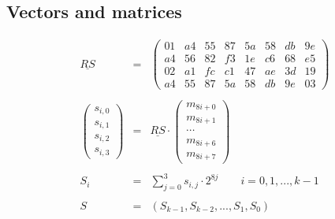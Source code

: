 \begin{table}[htb]
\subsection{Vectors and matrices}
\begin{equation}
\begin{array}{rcl}
\underline{RS} & = & \left(\begin{array}{cccccccc}
01 & a4 & 55 & 87 & 5a & 58 & db & 9e\\
a4 & 56 & 82 & f3 & 1e & c6 & 68 & e5\\
02 & a1 & fc & c1 & 47 & ae & 3d & 19\\
a4 & 55 & 87 & 5a & 58 & db & 9e & 03\end{array}\right)\\
\\
\left(\begin{array}{c}
	s_{i,0}\\
	s_{i,1}\\
	s_{i,2}\\
	s_{i,3}
\end{array}\right) & = & \underline{RS}\cdot%
\left(\begin{array}{c}
	m_{8i+0}\\
	m_{8i+1}\\
	\cdots\\
	m_{8i+6}\\
	m_{8i+7}
\end{array}\right)\\
\\
S_{i} & = & \sum_{j=0}^{3}s_{i,j}\cdot2^{8j}\qquad i=0,1,...,k-1\\
\\
S & = & \left(S_{k-1},S_{k-2},...,S_{1},S_{0}\right)
\end{array}
\end{equation}


\end{table}
